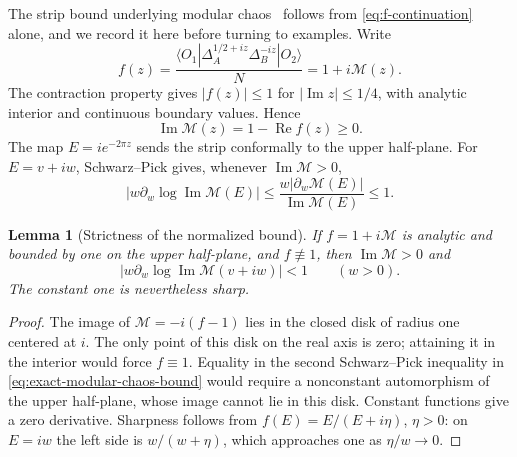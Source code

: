 \documentclass[a4paper,11pt]{article}
\newtheorem{lemma}[theorem]{Lemma}
\theoremstyle{definition}
\begin{document}
The strip bound underlying modular chaos~\cite{deBoerLamprou2020} follows from \eqref{eq:f-continuation} alone, and we record it here before turning to examples. Write
\begin{equation}
 f(z)=\frac{\langle O_1|\Delta_A^{1/2+iz}\Delta_B^{-iz}|O_2\rangle}{N}=1+i\mathcal M(z).
 \label{eq:normalized-characteristic}
\end{equation}
The contraction property gives $|f(z)|\le1$ for $|\operatorname{Im}z|\le1/4$, with analytic interior and continuous boundary values. Hence
\begin{equation}
 \operatorname{Im}\mathcal M(z)=1-\operatorname{Re}f(z)\ge0 .
 \label{eq:positive-imaginary-part}
\end{equation}
The map $E=ie^{-2\pi z}$ sends the strip conformally to the upper half-plane. For $E=v+iw$, Schwarz--Pick gives, whenever $\operatorname{Im}\mathcal M>0$,
\begin{equation}
 \left|w\partial_w\log\operatorname{Im}\mathcal M(E)\right|
 \le\frac{w|\partial_w\mathcal M(E)|}{\operatorname{Im}\mathcal M(E)}\le1 .
 \label{eq:exact-modular-chaos-bound}
\end{equation}

\begin{lemma}[Strictness of the normalized bound]\label{lem:strict-modular-chaos-bound}
If $f=1+i\mathcal M$ is analytic and bounded by one on the upper half-plane, and $f\not\equiv1$, then $\operatorname{Im}\mathcal M>0$ and
\begin{equation}
 \left|w\partial_w\log\operatorname{Im}\mathcal M(v+iw)\right|<1\qquad(w>0).
 \label{eq:strict-modular-chaos-bound}
\end{equation}
The constant one is nevertheless sharp. 
\end{lemma}
\begin{proof}
The image of $\mathcal M=-i(f-1)$ lies in the closed disk of radius one centered at $i$. The only point of this disk on the real axis is zero; attaining it in the interior would force $f\equiv1$. Equality in the second Schwarz--Pick inequality in \eqref{eq:exact-modular-chaos-bound} would require a nonconstant automorphism of the upper half-plane, whose image cannot lie in this disk. Constant functions give a zero derivative. Sharpness follows from $f(E)=E/(E+i\eta)$, $\eta>0$: on $E=iw$ the left side is $w/(w+\eta)$, which approaches one as $\eta/w\to0$.
\end{proof}
\end{document}
